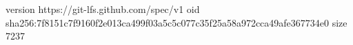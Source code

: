version https://git-lfs.github.com/spec/v1
oid sha256:7f8151c7f9160f2e013ca499f03a5c5c077c35f25a58a972cca49afe367734e0
size 7237
